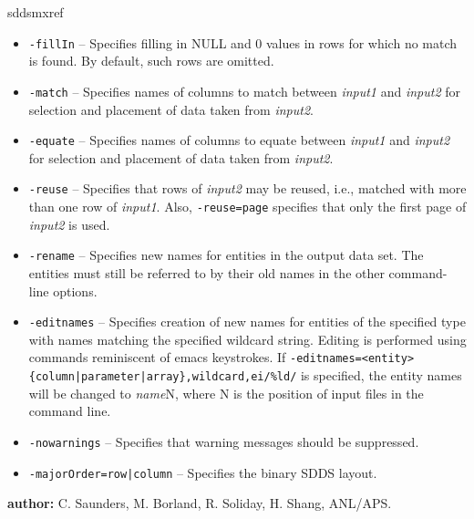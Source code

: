 \begin{sddsprog}{sddsmxref}
\begin{itemize}
    \item \verb|-fillIn| -- Specifies filling in NULL and 0 values in rows for which no match is found. By default, such rows are omitted.
    \item \verb|-match| -- Specifies names of columns to match between \emph{input1} and \emph{input2} for selection and placement of data taken from \emph{input2}.
    \item \verb|-equate| -- Specifies names of columns to equate between \emph{input1} and \emph{input2} for selection and placement of data taken from \emph{input2}.
    \item \verb|-reuse| -- Specifies that rows of \emph{input2} may be reused, i.e., matched with more than one row of \emph{input1}. Also, \verb|-reuse=page| specifies that only the first page of \emph{input2} is used.
    \item \verb|-rename| -- Specifies new names for entities in the output data set. The entities must still be referred to by their old names in the other command-line options.
    \item \verb|-editnames| -- Specifies creation of new names for entities of the specified type with names matching the specified wildcard string. Editing is performed using commands reminiscent of emacs keystrokes. If \verb+-editnames=<entity>{column|parameter|array},wildcard,ei/%ld/+ is specified, the entity names will be changed to \emph{name}N, where N is the position of input files in the command line.
    \item \verb|-nowarnings| -- Specifies that warning messages should be suppressed.
    \item \verb+-majorOrder=row|column+ -- Specifies the binary SDDS layout.
  \end{itemize}
  \item \textbf{author:} C. Saunders, M. Borland, R. Soliday, H. Shang, ANL/APS.
\end{sddsprog}
